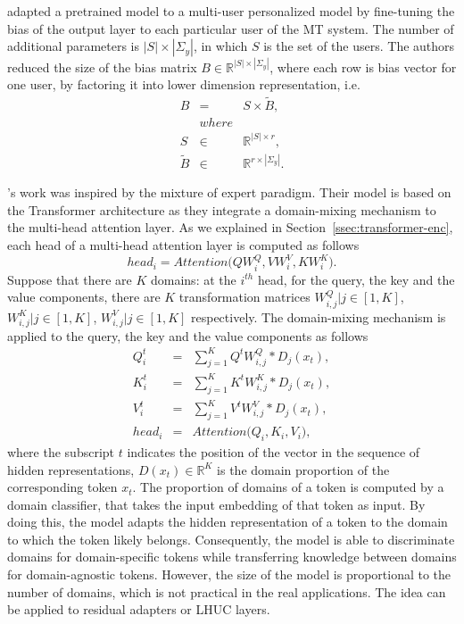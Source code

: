 \citet{Michel18extreme} adapted a pretrained model to a multi-user personalized model by fine-tuning the bias of the output layer to each particular user of the MT system. The number of additional parameters is $|S| \times |\Sigma_y|$, in which $S$ is the set of the users. The authors reduced the size of the bias matrix $B \in \mathbb{R}^{|S| \times |\Sigma_y|}$, where each row is bias vector for one user, by factoring it into lower dimension representation, i.e.
\begin{equation}
\begin{array}{rcl}
B &=& S \times \tilde{B}, \\
&where& \\
S & \in & \mathbb{R}^{|S| \times r}, \\
\tilde{B} & \in & \mathbb{R}^{r \times |\Sigma_y|}.
\end{array}
\end{equation}

\citet{Jiang20Multi}'s work was inspired by the mixture of expert paradigm. Their model is based on the Transformer architecture \citep{Vaswani17attention} as they integrate a domain-mixing mechanism to the multi-head attention layer. As we explained in Section~\ref{ssec:transformer-enc}, each head of a multi-head attention layer is computed as follows
\begin{equation}
head_i = Attention \big(QW_i^Q, VW_i^V, KW_i^K \big).
\end{equation}
Suppose that there are $K$ domains: at the $i^{th}$ head, for the query, the key and the value components, there are $K$ transformation matrices $W_{i,j}^Q | j \in [1,K]$, $W_{i,j}^K | j \in [1,K]$, $W_{i,j}^V | j \in [1,K]$ respectively. The domain-mixing mechanism is applied to the query, the key and the value components as follows
\begin{equation}
\begin{array}{rcl}
Q_i^t &=& \sum_{j=1}^K Q^tW_{i,j}^Q*\mathit{D}_j(x_t),\\
K_i^t &=& \sum_{j=1}^K K^tW_{i,j}^K*\mathit{D}_j(x_t),\\
V_i^t &=& \sum_{j=1}^K V^tW_{i,j}^V*\mathit{D}_j(x_t),\\
head_i &=& Attention \big( Q_i, K_i, V_i\big),
\end{array}
\end{equation}
where the subscript $t$ indicates the position of the vector in the sequence of hidden representations, $\mathit{D}(x_t) \in \mathbb{R}^{K}$ is the domain proportion of the corresponding token $x_t$. The proportion of domains of a token is computed by a domain classifier, that takes the input embedding of that token as input. By doing this, the model adapts the hidden representation of a token to the domain to which the token likely belongs. Consequently, the model is able to discriminate domains for domain-specific tokens while transferring knowledge between domains for domain-agnostic tokens. However, the size of the model is proportional to the number of domains, which is not practical in the real applications. The idea can be applied to residual adapters or LHUC layers.

